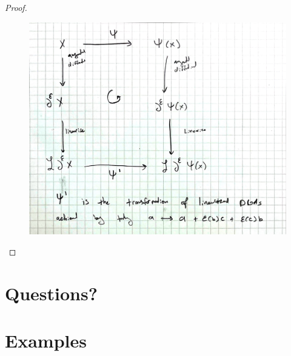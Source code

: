 \documentclass[11pt,oneside]{amsart}
\begin{document}
\begin{proof}
\begin{figure}[htbp]
  \includegraphics[width = 5in]{General-Information/Pictures/commutativediagram.pdf}

  
  
\end{figure}
















\end{proof}




\section{Questions?}



\section{Examples}


\end{document}

